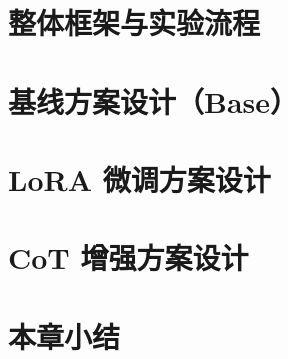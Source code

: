 
\section{整体框架与实验流程}


\section{基线方案设计（Base）}


\section{LoRA 微调方案设计}


\section{CoT 增强方案设计}


\section{本章小结}
